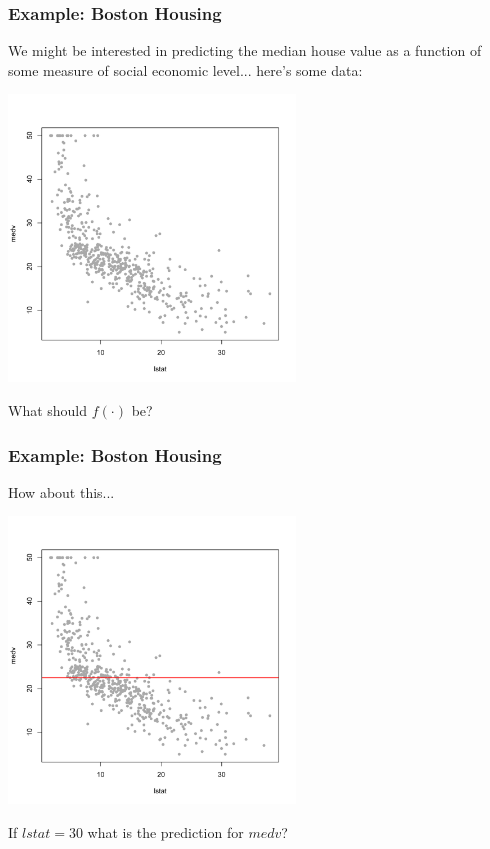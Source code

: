 \documentclass[flegn]{beamer}
\begin{document}
\begin{frame}
\frametitle{Example: Boston Housing}
We might be interested in predicting the median house value as a function of some measure of social economic level... here's some data:
\vspace{-0.9cm}
\begin{center}
\includegraphics[width=3in]{Boston1}
\end{center}
\vspace{-1cm}
{\color{red}What should $f(\cdot)$ be?}
\end{frame}



\begin{frame}
\frametitle{Example: Boston Housing}
How about this...
\vspace{-0.8cm}
\begin{center}
\includegraphics[width=3in]{Boston2}
\end{center}

\vspace{-0.5cm}
{\color{red}If $lstat=30$ what is the prediction for $medv$?}
\end{frame}
\end{document}
